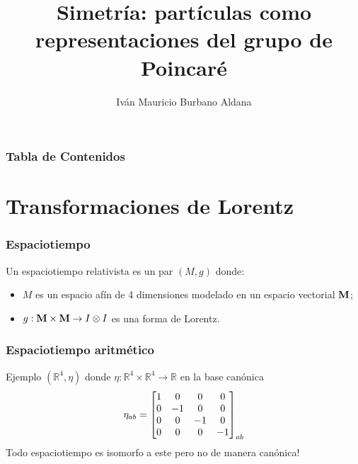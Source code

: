 \documentclass{beamer}
\title[Física de partículas]{Simetría: partículas como representaciones del grupo de Poincaré}
\author[I. Burbano]{Iván Mauricio Burbano Aldana}
\institute[Uniandes]{Universidad de los Andes}
\begin{document}
\frame{\titlepage}

\begin{frame}
\frametitle{Tabla de Contenidos}
\tableofcontents
\end{frame}

\section{Transformaciones de Lorentz}

\begin{frame}
\frametitle{Espaciotiempo}
Un espaciotiempo relativista es \cite{Matolcsi1993} un par $(M,g)$ donde:
\begin{itemize}
\item $M$ es un espacio afín de 4 dimensiones modelado en un espacio vectorial $\vb{M}$;
\item $g:\vb{M}\times \vb{M}\rightarrow I\otimes I$ es una forma de Lorentz.
\end{itemize}
\end{frame}

\begin{frame}
\frametitle{Espaciotiempo aritmético}
\begin{alertblock}{Ejemplo}
$(\mathbb{R}^4,\eta)$ donde $\eta:\mathbb{R}^4\times\mathbb{R}^4\rightarrow\mathbb{R}$ en la base canónica
\begin{equation}
\eta_{ab} = \mqty[1 & 0 & 0 & 0 \\ 0 & -1 & 0 & 0 \\ 0 & 0 & -1 & 0 \\ 0 & 0 & 0 & -1]_{ab}
\end{equation}
Todo espaciotiempo es isomorfo a este pero no de manera canónica!
\end{alertblock}
\end{frame}
\end{document}
